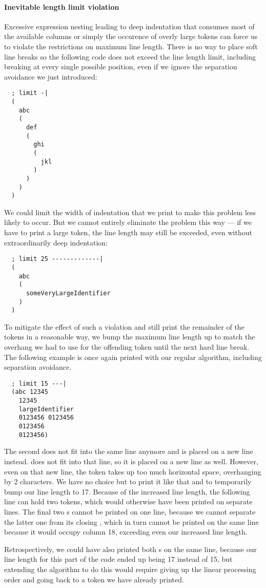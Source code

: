 \paragraph{Inevitable length limit violation}
Excessive expression nesting leading to deep indentation
that consumes most of the available columns
or simply the occurence of overly large tokens
can force us to violate the restrictions on maximum line length.
There is no way to place soft line breaks so
the following code does not exceed the line length limit,
including breaking at every single possible position,
even if we ignore the separation avoidance we just introduced:
\begin{verbatim}
  ; limit -|
  (
    abc
    (
      def
      (
        ghi
        (
          jkl
        )
      )
    )
  )
\end{verbatim}
We could limit the width of indentation that we print to make this problem less likely to occur.
But we cannot entirely eliminate the problem this way ---
if we have to print a large token, the line length may still be exceeded,
even without extraordinarily deep indentation:
\begin{verbatim}
  ; limit 25 -------------|
  (
    abc
    (
      someVeryLargeIdentifier
    )
  )
\end{verbatim}

To mitigate the effect of such a violation and still
print the remainder of the tokens in a reasonable way,
we bump the maximum line length up to match
the overhang we had to use for the offending token
until the next hard line break.
The following example is once again printed with our regular algorithm,
including separation avoidance.
\begin{verbatim}
  ; limit 15 ---|
  (abc 12345
    12345
    largeIdentifier
    0123456 0123456
    0123456
    0123456)
\end{verbatim}
The second  does not fit into the same line anymore and is placed on a new line instead.
 does not fit into that line, so it is placed on a new line as well.
However, even on that new line,
the token takes up too much horizontal space, overhanging by 2 characters.
We have no choice but to print it like that and to temporarily bump our line length to 17.
Because of the increased line length, the following line can hold two  tokens,
which would otherwise have been printed on separate lines.
The final two s cannot be printed on one line,
because we cannot separate the latter one from its closing ,
which in turn cannot be printed on the same line because it would occupy column 18,
exceeding even our increased line length.

Retrospectively, we could have also printed both s on the same line,
because our line length for this part of the code ended up being 17 instead of 15,
but extending the algorithm to do this would require giving up the linear processing order
and going back to a token we have already printed.
